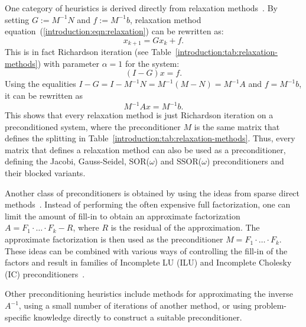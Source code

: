 One category of heuristics is derived directly from relaxation
methods~\cite{saad}. By setting $G := M^{-1}N$ and $f := M^{-1}b$, relaxation
method equation~(\ref{introduction:eqn:relaxation}) can be rewritten as:
\begin{equation}
    x_{k+1} = Gx_{k} + f.
\end{equation}
This is in fact Richardson iteration (see
Table~\ref{introduction:tab:relaxation-methods}) with parameter $\alpha = 1$ for
the system:
\begin{equation}
    (I - G)x = f.
\end{equation}
Using the equalities $I - G = I - M^{-1}N = M^{-1}(M - N) = M^{-1}A$ and $f =
M^{-1}b$, it can be rewritten as
\begin{equation}
    M^{-1}Ax = M^{-1}b.
\end{equation}
This shows that every relaxation method is just Richardson iteration on a
preconditioned system, where the preconditioner $M$ is the same matrix that
defines the splitting in Table~\ref{introduction:tab:relaxation-methods}. Thus,
every matrix that defines a relaxation method can also be used as a
preconditioner, defining the Jacobi, Gauss-Seidel, SOR($\omega$) and
SSOR($\omega$) preconditioners and their blocked variants.

Another class of preconditioners is obtained by using the ideas from sparse
direct methods~\cite{saad}. Instead of performing the often expensive full
factorization, one can limit the amount of fill-in to obtain an approximate
factorization $A = F_1 \cdot \ldots \cdot F_k - R$, where $R$ is the residual of
the approximation. The approximate factorization is then used as the
preconditioner $M = F_1 \cdot \ldots \cdot F_k$. These ideas can be combined
with various ways of controlling the fill-in of the factors and result in
families of Incomplete LU (ILU) and Incomplete Cholesky (IC)
preconditioners~\cite{saad, parilut}.

Other preconditioning heuristics include methods for approximating the inverse
$A^{-1}$, using a small number of iterations of another method, or using
problem-specific knowledge directly to construct a suitable preconditioner.
